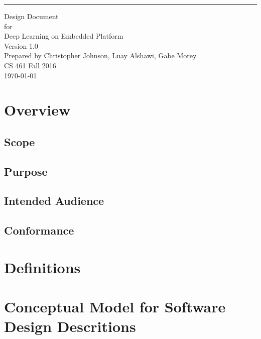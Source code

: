 \documentclass{scrreprt}
\date{}
\newcommand\blankpage{%
    \null
    \thispagestyle{empty}%
    \addtocounter{page}{-1}%
    \newpage}
\def\myversion{1.0 }
\begin{document}
\begin{flushright}
    \rule{16cm}{5pt}\vskip1cm
    \begin{bfseries}
        \Huge{Design Document}\\
        \vspace{1.9cm}
        for\\
        \vspace{1.9cm}
        Deep Learning on Embedded Platform\\
        \vspace{1.9cm}
        \LARGE{Version \myversion}\\
        \vspace{1.9cm}
        Prepared by Christopher Johnson, Luay Alshawi, Gabe Morey\\
        \vspace{1.9cm}
        CS 461 Fall 2016\\
        \vspace{1.9cm}
        \today\\
    \end{bfseries}
\end{flushright}
\afterpage{\blankpage}

\tableofcontents

\section{Overview}
\subsection{Scope}

\subsection{Purpose}

\subsection{Intended Audience}

\subsection{Conformance}

\section{Definitions}

\section{Conceptual Model for Software Design Descritions}
\end{document}
